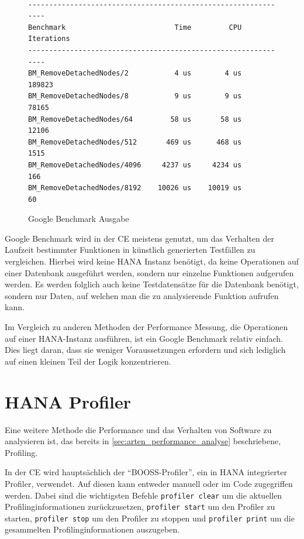 \begin{figure}[h]
    \begin{center}
        \begin{verbatim}

---------------------------------------------------------------
Benchmark                          Time         CPU Iterations 
---------------------------------------------------------------
BM_RemoveDetachedNodes/2           4 us        4 us     189823 
BM_RemoveDetachedNodes/8           9 us        9 us      78165 
BM_RemoveDetachedNodes/64         58 us       58 us      12106 
BM_RemoveDetachedNodes/512       469 us      468 us       1515 
BM_RemoveDetachedNodes/4096     4237 us     4234 us        166 
BM_RemoveDetachedNodes/8192    10026 us    10019 us         60 
        \end{verbatim}
    \end{center}
    \caption{Google Benchmark Ausgabe}\label{fig:google_benchmark_ausgabe}
\end{figure}

Google Benchmark wird in der \ac{CE} meistens genutzt, um das Verhalten der
Laufzeit bestimmter Funktionen in künstlich generierten Testfällen zu
vergleichen. Hierbei wird keine HANA Instanz benötigt, da
keine Operationen auf einer Datenbank ausgeführt werden, sondern nur einzelne
Funktionen aufgerufen werden. Es werden folglich
auch keine Testdatensätze für die Datenbank benötigt, sondern nur Daten, auf
welchen man die zu analysierende Funktion aufrufen kann.

Im Vergleich zu anderen Methoden der Performance Messung, die Operationen auf
einer HANA-Instanz ausführen, ist ein Google Benchmark relativ einfach.
Dies liegt daran, dass sie weniger Voraussetzungen erfordern und sich lediglich
auf einen kleinen Teil der Logik konzentrieren.

\section{HANA Profiler}
\label{sec:hana_profiler}


Eine weitere Methode die Performance und das Verhalten von Software zu
analysieren ist, das bereits in \autoref{sec:arten_performance_analyse}
beschriebene, Profiling.

In der \ac{CE} wird hauptsächlich der \enquote{BOOSS-Profiler}, ein in HANA
integrierter Profiler, verwendet. Auf diesen kann entweder manuell oder im Code
zugegriffen werden. Dabei sind die wichtigsten Befehle \texttt{profiler clear}
um die aktuellen Profilinginformationen zurückzusetzen,  \texttt{profiler
start} um den Profiler zu starten, \texttt{profiler stop} um den Profiler zu
stoppen und \texttt{profiler print} um die gesammelten Profilinginformationen
auszugeben.


